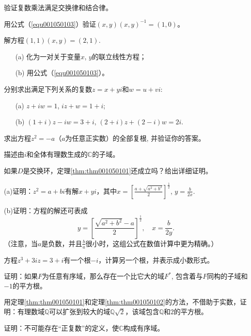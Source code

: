 \begin{problemset}
\item 验证复数乘法满足交换律和结合律。

\item 用公式（\ref{equ001050103}）验证$(x, y)(x, y)^{-1} = (1, 0)$。

\item 解方程$(1, 1)(x,y)=(2,1)$.
\begin{enumerate}
\item[(a)]化为一对关于变量$x$, $y$的联立线性方程；
\item[(b)]用公式（\ref{equ001050103}）。
\end{enumerate}

\item 分别求出满足下列关系的复数$z = x+yi$和$w = u+vi$:
\begin{enumerate}
\item[(a)] $z+iw = 1$, $iz+w = 1+i$;
\item[(b)] $(1+i)z - iw = 3+i$, $(2+i)z + (2-i)w=2i$.
\end{enumerate}

\item 求出方程$z^2 = -a$（$a$为任意正实数）的全部复根, 并验证你的答案。

\item 描述由$i$和全体有理数生成的$\mathbb{C}$的子域。

\item 如果$D$是交换环，定理\ref{thm:thm001050101}还成立吗？给出详细证明。

\item (a)证明：$z^2 = a + bi$有解$x+yi$，其中$x = \left[\frac{a+\sqrt{a^2+b^2}}{2}\right]^{\frac{1}{2}}$, $y = \frac{b}{2x}$.

(b)证明：方程的解还可表成
\[
y = \left[\frac{\sqrt{a^2+b^2} - a}{2}\right]^{\frac{1}{2}}, \quad x = \frac{b}{2y}.
\]
（注意，当$a$是负数，并且$\frac{b}{a}$很小时，这组公式在数值计算中更为精确。）

\item 方程$z^3+3iz = 3+i$有一个根$-i$，计算另一个根，并表示成小数形式。

\item 证明：如果$F$为任意有序域，那么存在一个比它大的域$F^*$, 包含着与$F$同构的子域和$-1$的平方根。

\item 用定理\ref{thm:thm001050101}和定理\ref{thm:thm001050102}的方法，不借助于实数，证明：有理数域$\mathbb{Q}$可以扩张到较大的域$\mathbb{Q}\sqrt{2}$，该域包含$\mathbb{Q}$和$2$的平方根。

\item 证明：不可能存在“正复数”的定义，使$\mathbb{C}$构成有序域。
\end{problemset}



